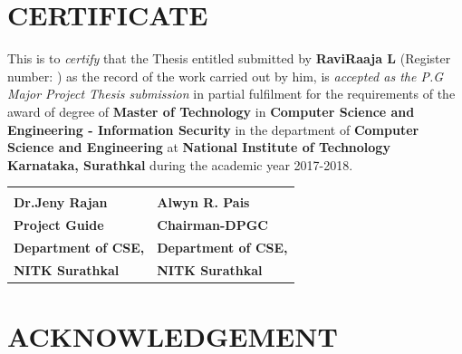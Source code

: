 \documentclass[a4paper,12pt, twoside]{NITKReport}
\let\oldemph\emph
\renewcommand\emph[1]{{\fontsize{13pt}{14pt}\selectfont\oldemph{#1}}}
\begin{document}
	\section*{\centering CERTIFICATE}
	This is to \emph{certify} that the Thesis entitled 
	{\bf \thesistitle} 
	submitted by {\bf RaviRaaja L} (Register number: \regno) as the 
	record of the work carried out by him, is \emph{accepted as the  
		P.G Major Project Thesis submission} in partial fulfilment for 
	the requirements of the award of degree of {\bf Master of Technology} 
	in {\bf Computer Science and Engineering - Information Security} in the department of {\bf Computer Science and Engineering} 
	at {\bf National Institute of Technology Karnataka, Surathkal} during the 
	academic year 2017-2018.
	
	
	\vspace{1.4in}
	\begin{tabular}{ll}
		\hspace{-1cm}{...............................}&\hspace{6cm}{...............................}\\
		\hspace{-1cm}\bf{Dr.Jeny Rajan}  & \hspace{6cm}\textbf{Alwyn R. Pais}			\\
		\hspace{-1cm}\bf{Project Guide}     &\hspace{6cm}\bf{Chairman-DPGC}\\
		\hspace{-1cm}\bf{Department of CSE,}	  &\hspace{6cm}\bf{Department of CSE,}			\\
		\hspace{-1cm}\bf{NITK Surathkal}	  &\hspace{6cm}\bf{NITK Surathkal}\\
		
	\end{tabular}
	
	
	
	
	\newpage
	\pagestyle{plain}
	\thispagestyle{empty}
	\section*{\centering ACKNOWLEDGEMENT}
	
\end{document}
